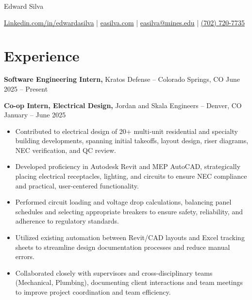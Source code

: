 \documentclass[11pt]{article}       %
\begin{document}
\centerline{\huge Edward Silva}
\vspace{5pt}

\centerline{
\href{https://www.linkedin.com/in/edwardasilva/}{Linkedin.com/in/edwardasilva}
| \href{https://easilva.com}{easilva.com}
| \href{mailto:easilva@mines.edu}{easilva@mines.edu} 
| \href{tel:7027207735}{(702) 720-7735}
}

\vspace{-14pt}
\section*{Experience}
\vspace{5pt}

\textbf{Software Engineering Intern, }{Kratos Defense} -- Colorado Springs, CO \hfill June 2025 -- Present \\
\vspace{6.5pt}

\textbf{Co-op Intern, Electrical Design, }{Jordan and Skala Engineers} -- Denver, CO \hfill January -- June 2025 \\
\vspace{-6.5pt}
\begin{itemize}
  \item Contributed to electrical design of 20+ multi-unit residential and specialty building developments, spanning initial takeoffs, layout design, riser diagrams, NEC verification, and QC review.
  \item Developed proficiency in Autodesk Revit and MEP AutoCAD, strategically placing electrical receptacles, lighting, and circuits to ensure NEC compliance and practical, user-centered functionality.
  \item Performed circuit loading and voltage drop calculations, balancing panel schedules and selecting appropriate breakers to ensure safety, reliability, and adherence to regulatory standards.
  \item Utilized existing automation between Revit/CAD layouts and Excel tracking sheets to streamline design documentation processes and reduce manual errors.
  \item Collaborated closely with supervisors and cross-disciplinary teams (Mechanical, Plumbing), documenting client interactions and team meetings to improve project coordination and team efficiency.
\end{itemize}
\end{document}
